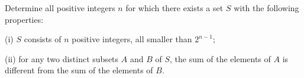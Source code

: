 Determine all positive integers $n$ for which there exists a set $S$ with the following properties:

(i) $S$ consists of $n$ positive integers, all smaller than $2^{n-1}$;

(ii) for any two distinct subsets $A$ and $B$ of $S$,  the sum of the elements of $A$ is different from the sum of the elements of $B$.